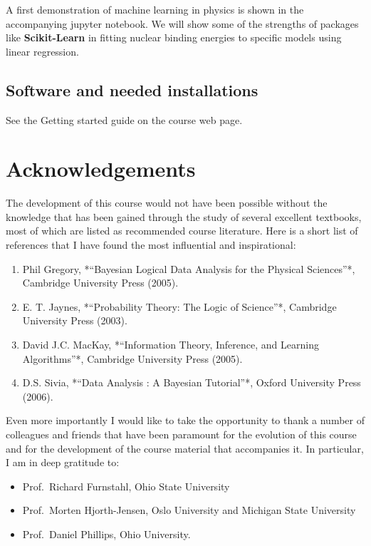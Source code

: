 \documentclass[%
oneside,                 %
final,                   %
10pt]{article}
\begin{document}
A first demonstration of machine learning in physics is shown in the accompanying jupyter notebook. We will show some of the strengths of packages like \textbf{Scikit-Learn} in fitting nuclear binding energies to specific models using linear regression.

\subsection{Software and needed installations}

See the Getting started guide on the course web page.

\section{Acknowledgements}

The development of this course would not have been possible without the knowledge that has been gained through the study of several excellent textbooks, most of which are listed as recommended course literature. Here is a short list of references that I have found the most influential and inspirational:

\begin{enumerate}
\item Phil Gregory, *``Bayesian Logical Data Analysis for the Physical Sciences''*, Cambridge University Press (2005).

\item E. T. Jaynes, *``Probability Theory: The Logic of Science''*, Cambridge University Press (2003).

\item David J.C. MacKay, *``Information Theory, Inference, and Learning Algorithms''*, Cambridge University Press (2005).

\item D.S. Sivia, *``Data Analysis : A Bayesian Tutorial''*, Oxford University Press (2006).
\end{enumerate}

\noindent
Even more importantly I would like to take the opportunity to thank a number of colleagues and friends that have been paramount for the evolution of this course and for the
development of the course material that accompanies it. In particular, I am in deep gratitude to:

\begin{itemize}
\item Prof.~Richard Furnstahl, Ohio State University

\item Prof.~Morten Hjorth-Jensen, Oslo University and Michigan State University

\item Prof.~Daniel Phillips, Ohio University.
\end{itemize}
\end{document}
